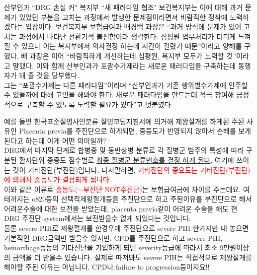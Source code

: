 \begin{hemphsentense}{산부인과 ``DRG 손실 커" 복지부 ``새 패러다임 협조"}
보건복지부는 이에 대해 과거 문제가 있었던 부분을 고치는 과정에서 발생한 문제점이라면서 바람직한 정착에 노력하겠다는 입장이다. 보건복지부 보험급여과 배경택 과장은 “과거 방식에 문제가 있어 고치는 과정에서 나타난 전환기적 불편함이라 생각한다. 심평원 업무처리가 더디게 느껴질 수 있으나 이는 복지부에서 의사결정 하는데 시간이 걸렸기 때문”이라고 양해를 구했다. 배 과장은 이어 “바람직하게 개선하는데 심평원, 복지부 모두가 노력할 것”이라고 말했다. 이와 함께 산부인과가 포괄수가제라는 새로운 패러다임을 구축하는데 동행자가 돼 줄 것을 당부했다.\\
그는 “포괄수가제는 다른 패러다임”이라며 “산부인과가 기존 행위별수가제에 안주할 수 있을까에 대해 고민을 해봐야 한다. 새로운 패러다임을 만드는데 적극 참여해 긍정적으로 구축할 수 있도록 노력할 필요가 있다”고 덧붙였다.
\end{hemphsentense}
예를 들면 한국표준질병사인분류 질병코딩지침서에 의거해 제왕절개를 하게된 주된 사유인 Placenta previa를 주진단으로 하게되면, 중등도가 반영되지 않아서 손해를 보게된다고 하는데 이게 어떤 의미일까? \\ DRG에서 마지막 단계로 합병증 및 동반상병 분류로 각 질병군 범주의 특성에 따라 구분된 환자단위 중증도 점수별로 \uline{최종 질병군 분류번호를 결정 하게 된다}. 여기에 쓰이는 것이 기타진단(부진단)입니다. 다시말하면, \textcolor{red}{기타진단의 중요도는 기타진단(부진단)에 의해서 중등도가 결정되게 됩니다.}\\
이와 같은 이류로 \textcolor{red}{중등도(=부진단 NOT주진단)}는 보험급여금에 차이를 주는데요. 여태까지는 o820등의 선택적제왕절개등을 주진단으로 하고 주된이유를 부진단으로 해서 어려운수술에 대한 보전을 받았는데, placenta previa같이 어려운 수술을 해도 현 DRG 주진단 system에서는 보전받을수 없게 되었다는 것입니다. \\
물론 severe PIH로 제왕절개를 한경우에 주진단으로 severe PIH 한가지만 내 놓으면 기본적인 DRG금액만 받을수 있지만, CPD를 주진단으로 하고 severe PIH, hemorrhage등등의 기타진단을 기입하게 되면 severity등급에 따라서 최소 9만원이상의 금액을 더 받을수 있습니다. 실제로 따져봐도 severe PIH는 직접적으로 제왕절개를 해야할 주된 이유는 아닙니다. CPD나 failure to progression등이지요!!\\
\clearpage

